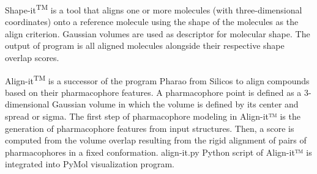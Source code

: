 Shape-it\textsuperscript{TM} is a tool that aligns one or more molecules (with three-dimensional coordinates) onto a reference molecule using the shape of the molecules as the align criterion. Gaussian volumes are used as descriptor for molecular shape. The output of program is all aligned molecules alongside their respective shape overlap scores.

Align-it\textsuperscript{TM} is a successor of the program Pharao \cite{Taminau_2008} from Silicos to align compounds based on their pharmacophore features. A pharmacophore point is defined as a 3-dimensional Gaussian volume in which the volume is defined by its center and spread or sigma.
The first step of pharmacophore modeling in Align-it™ is the generation of pharmacophore features from input structures. Then, a score is computed from the volume overlap resulting from the rigid alignment of pairs of pharmacophores in a fixed conformation. align-it.py Python script of Align-it™ is integrated into PyMol visualization program.
